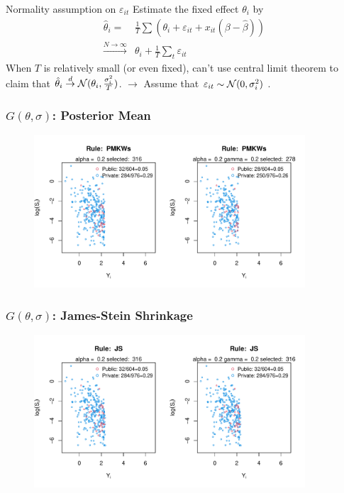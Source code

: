 \documentclass[10pt,mathserif,aspectratio=169]{beamer}
\begin{document}
\begin{frame}[label=normality]{Normality assumption on $\varepsilon_{it}$}
  Estimate the fixed effect $\theta_i$ by
  \begin{align*}
    \hat{\theta}_i =                       & \frac{1}{T}\sum(\theta_i+\varepsilon_{it}+x_{it}(\beta-\hat{\beta})) \\
    \overset{N\to \infty}{\longrightarrow} & \theta_i+\frac{1}{T}\sum_t \varepsilon_{it}
  \end{align*}
  When $T$ is relatively small (or even fixed), can't use central limit theorem to claim that $\hat{\theta}_i \overset{d}{\to} \mathcal{N}(\theta_i,\frac{\sigma_i^2}{T})$.
  $\longrightarrow$ Assume that $\varepsilon_{it} \sim \mathcal{N}(0,\sigma_i^2)$ .
  \hyperlink{observation}{}   \hyperlink{limitation}{}
\end{frame}

\begin{frame}
  \frametitle{$G(\theta,\sigma)$: Posterior Mean}
  \begin{figure}
    \centering
    \includegraphics[width=0.9\textwidth]{../../Figures/2013-2022/GMM_fd/GLVmix/Left_0.2_0.2_PMKWs.pdf}
  \end{figure}
\end{frame}

\begin{frame}
  \frametitle{$G(\theta,\sigma)$: James-Stein Shrinkage}
  \begin{figure}
    \centering
    \includegraphics[width=0.9\textwidth]{../../Figures/2013-2022/GMM_fd/GLVmix/Left_0.2_0.2_JS.pdf}
  \end{figure}
\end{frame}
\end{document}
